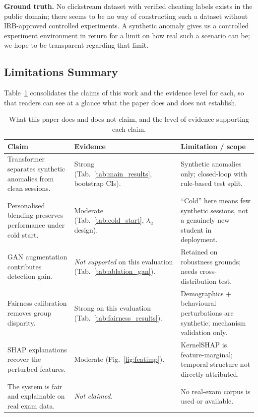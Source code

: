 \documentclass[sigconf]{acmart}
\begin{document}
\textbf{Ground truth.} No clickstream dataset with verified cheating labels exists in the public domain; there seems to be no way of constructing such a dataset without IRB-approved controlled experiments. A synthetic anomaly gives us a controlled experiment environment in return for a limit on how real such a scenario can be; we hope to be transparent regarding that limit.

\subsection*{Limitations Summary}
Table~\ref{tab:limitations} consolidates the claims of this work and the evidence level for each, so that readers can see at a glance what the paper does and does not establish.

\begin{table}[htbp]
\caption{What this paper does and does not claim, and the level of evidence supporting each claim.}
\label{tab:limitations}
\centering
\small
\begin{tabular}{p{}p{}p{}}
\toprule
\textbf{Claim} & \textbf{Evidence} & \textbf{Limitation / scope} \\
\midrule
Transformer separates synthetic anomalies from clean sessions. & Strong (Tab.~\ref{tab:main_results}, bootstrap CIs). & Synthetic anomalies only; closed-loop with rule-based test split. \\
Personalised blending preserves performance under cold start. & Moderate (Tab.~\ref{tab:cold_start}, $\lambda_u$ design). & ``Cold'' here means few synthetic sessions, not a genuinely new student in deployment. \\
GAN augmentation contributes detection gain. & \emph{Not supported} on this evaluation (Tab.~\ref{tab:ablation_gan}). & Retained on robustness grounds; needs cross-distribution test. \\
Fairness calibration removes group disparity. & Strong on this evaluation (Tab.~\ref{tab:fairness_results}). & Demographics + behavioural perturbations are synthetic; mechanism validation only. \\
SHAP explanations recover the perturbed features. & Moderate (Fig.~\ref{fig:featimp}). & KernelSHAP is feature-marginal; temporal structure not directly attributed. \\
The system is fair and explainable on real exam data. & \emph{Not claimed.} & No real-exam corpus is used or available. \\
\bottomrule
\end{tabular}
\end{table}
\end{document}
